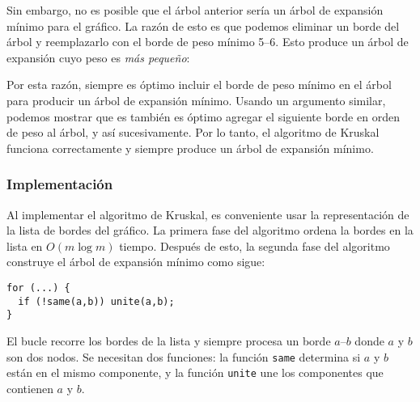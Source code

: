Sin embargo, no es posible que el árbol anterior
sería un árbol de expansión mínimo para el gráfico.
La razón de esto es que podemos eliminar un borde
del árbol y reemplazarlo con el borde de peso mínimo 5--6.
Esto produce un árbol de expansión cuyo peso es
\emph{más pequeño}:

\begin{center}
\end{center}

Por esta razón, siempre es óptimo
incluir el borde de peso mínimo
en el árbol para producir un árbol de expansión mínimo.
Usando un argumento similar, podemos mostrar que es
también es óptimo agregar el siguiente borde en orden de peso
al árbol, y así sucesivamente.
Por lo tanto, el algoritmo de Kruskal funciona correctamente y
siempre produce un árbol de expansión mínimo.

\subsubsection{Implementación}

Al implementar el algoritmo de Kruskal,
es conveniente usar
la representación de la lista de bordes del gráfico.
La primera fase del algoritmo ordena la
bordes en la lista en $O(m \log m)$ tiempo.
Después de esto, la segunda fase del algoritmo
construye el árbol de expansión mínimo como sigue:

\begin{lstlisting}
for (...) {
  if (!same(a,b)) unite(a,b);
}
\end{lstlisting}

El bucle recorre los bordes de la lista
y siempre procesa un borde $a$--$b$
donde $a$ y $b$ son dos nodos.
Se necesitan dos funciones:
la función \texttt{same} determina
si $a$ y $b$ están en el mismo componente,
y la función \texttt{unite}
une los componentes que contienen $a$ y $b$.

